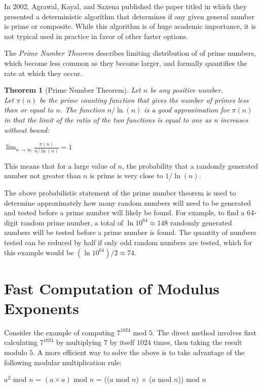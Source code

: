 \documentclass[twoside]{article}
\newcounter{lecnum}
\newtheorem{theorem}{Theorem}[lecnum]
\begin{document}
In 2002, Agrawal, Kayal, and Saxena published the paper titled  in which they presented a deterministic algorithm that determines if any given general number is prime or composite. While this algorithm is of huge academic importance, it is not typical used in practice in  favor of other faster options.  

The \textit{Prime Number Theorem} describes limiting distribution of of prime numbers, which become less common as they become larger, and formally quantifies the rate at which they occur. 

\begin{theorem}[Prime Number Theorem]
Let $n$ be any positive number.\\
Let $\pi(n)$ be the prime counting function that gives the number of primes less than or equal to $n$.
The function $n/\ln(n)$ is a good approximation for $\pi(n)$ in that the limit of the ratio of the two functions is equal to one as n increases without bound:

\displaystyle $\lim_{n\to\infty} \frac{\pi(n)}{n/\ln(n)} = 1$ 
\end{theorem}

This means that for a large value of $n$, the probability that a randomly generated number not greater than $n$ is prime is very close to  $1/\ln(n)$. 

The above probabilistic statement of the prime number theorem is used to determine approximately how many random numbers will need to be generated and tested before a prime number will likely be found. For example, to find a 64-digit random prime number, a total of $\ln 10^{64} \approx 148$ randomly generated numbers will be tested before a prime number is found. The quantity of numbers tested can be reduced by half if only odd random numbers are tested, which for this example would be $(\ln 10^{64})/2 \approx 74$.

\section{Fast Computation of Modulus Exponents}

Consider the example of computing $7^{1024}$ mod $5$. The direct method involves first calculating $7^{1024}$ by multiplying $7$ by itself $1024$ times, then taking the result modulo $5$. A more efficient way to solve the above is to take advantage of the following modular multiplication rule:

$a^2$ mod $n$ = $(a \times a)$ mod $n$ = (($a$ mod $n$) $\times$ ($a$ mod $n$)) mod $n$ \\
\end{document}
